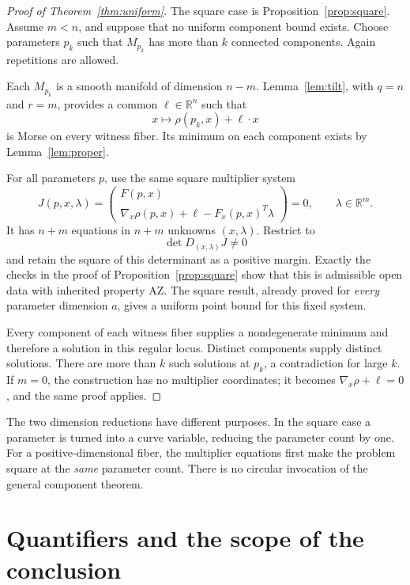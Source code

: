 \documentclass[11pt]{article}
\theoremstyle{definition}
\theoremstyle{remark}
\newcommand{\R}{\mathbb R}
\newcommand{\AZ}{\mathrm{AZ}}
\begin{document}
\begin{proof}[Proof of Theorem~\ref{thm:uniform}]
The square case is Proposition~\ref{prop:square}. Assume \(m<n\),
and suppose that no uniform component bound exists. Choose
parameters \(p_k\) such that \(M_{p_k}\) has more than \(k\)
connected components. Again repetitions are allowed.

Each \(M_{p_k}\) is a smooth manifold of dimension \(n-m\).
Lemma~\ref{lem:tilt}, with \(q=n\) and \(r=m\), provides a common
\(\ell\in\R^n\) such that
\[
 x\longmapsto\rho(p_k,x)+\ell\cdot x
\]
is Morse on every witness fiber. Its minimum on each component
exists by Lemma~\ref{lem:proper}.

For all parameters \(p\), use the same square multiplier system
\begin{equation}
 J(p,x,\lambda)=
 \begin{pmatrix}
 F(p,x)\\
 \nabla_x\rho(p,x)+\ell-F_x(p,x)^T\lambda
 \end{pmatrix}=0,\qquad \lambda\in\R^m.
 \label{eq:positive-dimensional}
\end{equation}
It has \(n+m\) equations in \(n+m\) unknowns \((x,\lambda)\).
Restrict to
\[
 \det D_{(x,\lambda)}J\ne0
\]
and retain the square of this determinant as a positive margin.
Exactly the checks in the proof of Proposition~\ref{prop:square}
show that this is admissible open data with inherited property
\(\AZ\). The square result, already proved for \emph{every}
parameter dimension \(a\), gives a uniform point bound for this
fixed system.

Every component of each witness fiber supplies a nondegenerate
minimum and therefore a solution in this regular locus.
Distinct components supply distinct solutions. There are more than
\(k\) such solutions at \(p_k\), a contradiction for large \(k\).
If \(m=0\), the construction has no multiplier coordinates; it
becomes \(\nabla_x\rho+\ell=0\), and the same proof applies.
\end{proof}

The two dimension reductions have different purposes. In the square
case a parameter is turned into a curve variable, reducing the
parameter count by one. For a positive-dimensional fiber, the
multiplier equations first make the problem square at the
\emph{same} parameter count. There is no circular invocation of the
general component theorem.

\section{Quantifiers and the scope of the conclusion}
\label{sec:quantifiers}
\end{document}
